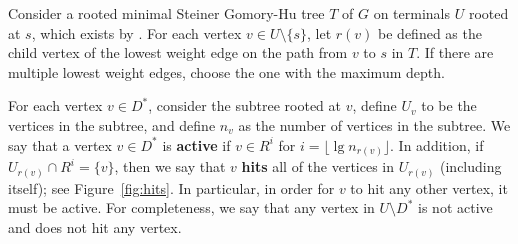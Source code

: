 \documentclass{article}
\newcommand{\sm}{\setminus}
\newcommand{\Om}{\Omega}
\newcommand{\lf}{\lfloor}
\newcommand{\rf}{\rfloor}
\newcommand{\E}{\mathbb E}
\newcommand{\1}{\mathbbm 1}
\newcommand{\alert}{\textcolor{red}}
\newcommand{\thm}[1]{\Cref{thm:#1}}
\renewcommand{\emph}[1]{\textbf{\textup{#1}}}
\begin{document}
Consider a rooted minimal Steiner Gomory-Hu tree $T$ of $G$ on terminals $U$ rooted at $s$, which exists by \thm{rooted}. 
For each vertex $v\in U\sm \{s\}$, let $r(v)$ be defined as the child vertex of the lowest weight edge on the path from $v$ to $s$ in $T$. If there are multiple lowest weight edges, choose the one with the maximum depth. %


For each vertex $v\in D^*$, consider the subtree rooted at $v$, define $U_v$ to be the vertices in the subtree, and define $n_v$ as the number of vertices in the subtree. We say that a vertex $v\in D^*$ is \emph{active} if $v\in R^i$ for $i=\lf\lg n_{r(v)}\rf$. In addition, if $U_{r(v)}\cap R^i=\{v\}$, then we say that $v$ \emph{hits} all of the vertices in $U_{r(v)}$ (including itself); see Figure~\ref{fig:hits}. In particular, in order for $v$ to hit any other vertex, it must be active. For completeness, we say that any vertex in $U\sm D^*$ is not active and does not hit any vertex.


\end{document}
